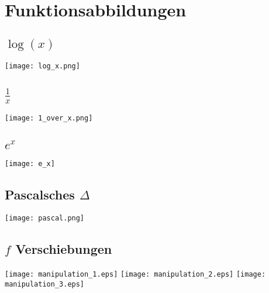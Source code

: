 \section{Funktionsabbildungen}
\begin{multicols}{2}
\subsection*{$\log(x)$}
\texttt{[image: log\_x.png]}

\subsection*{$\frac{1}{x}$}
\texttt{[image: 1\_over\_x.png]}


\subsection*{$e^x$}
\texttt{[image: e\_x]}

\subsection*{Pascalsches $\Delta$}
\texttt{[image: pascal.png]}

\subsection*{\small $f$ Verschiebungen}
\texttt{[image: manipulation\_1.eps]}
\texttt{[image: manipulation\_2.eps]}
\texttt{[image: manipulation\_3.eps]}
\end{multicols}